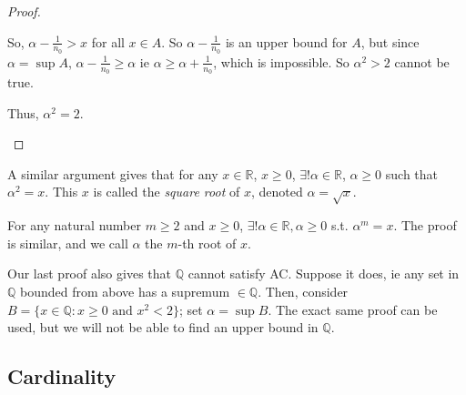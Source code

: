 \documentclass[12pt]{article}
\begin{document}
\begin{proof}
\begin{itemize}
\begin{itemize}[label=]
      So, $\alpha - \frac{1}{n_0} > x$ for all $x \in A$. So $\alpha - \frac{1}{n_0}$ is an upper bound for $A$, but since $\alpha = \sup A$, $\alpha - \frac{1}{n_0} \geq \alpha$ ie $\alpha \geq \alpha + \frac{1}{n_0}$, which is impossible. So $\alpha^2 > 2$ cannot be true.
    \end{itemize}

    Thus, $\alpha^2 = 2$.
  \end{itemize}
\end{proof}


\begin{remark}
  A similar argument gives that for any $x \in \mathbb{R}$, $x \geq 0$, $\exists! \alpha \in \mathbb{R}$, $\alpha \geq 0$ such that $\alpha^2 = x$. This $x$ is called the \emph{square root} of $x$, denoted $\alpha = \sqrt{x}$.
\end{remark}

\begin{remark}
  For any natural number $m \geq 2$ and $x \geq 0$, $\exists ! \alpha \in \mathbb{R}, \alpha \geq 0$ s.t. $\alpha^m = x$. The proof is similar, and we call $\alpha$ the $m$-th root of $x$.
\end{remark}

\begin{remark}
  Our last proof also gives that $\mathbb{Q}$ cannot satisfy AC. Suppose it does, ie any set in $\mathbb{Q}$ bounded from above has a supremum $\in \mathbb{Q}$. Then, consider $B = \{x \in \mathbb{Q} : x \geq 0 \text{ and } x^2 < 2\}$; set $\alpha = \sup B$. The exact same proof can be used, but we will not be able to find an upper bound in $\mathbb{Q}$.
\end{remark}


\subsection{Cardinality}
\end{document}
